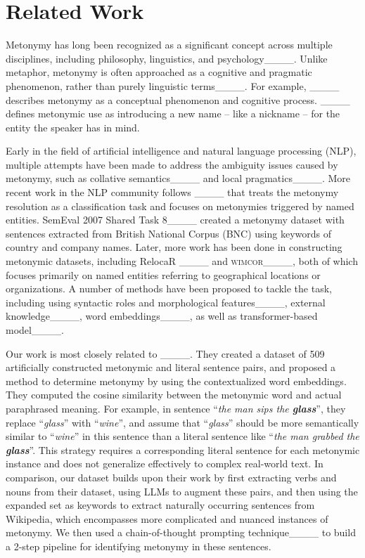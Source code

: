 \section{Related Work}
Metonymy has long been recognized as a significant concept across multiple disciplines,  including philosophy, linguistics, and psychology____. Unlike metaphor, metonymy is often approached as a cognitive and pragmatic phenomenon, rather than purely linguistic terms____. For example, ____ describes metonymy as a conceptual phenomenon and cognitive process.  ____ defines metonymic use as introducing a new name – like a nickname – for the entity the speaker has in mind. 

Early in the field of artificial intelligence and natural language processing (NLP), multiple attempts have been made to address the ambiguity issues caused by metonymy, such as collative semantics____ and local pragmatics____. More recent work in the NLP community follows ____ that treats the metonymy resolution as a classification task and focuses on metonymies triggered by named entities. SemEval 2007 Shared Task 8____ created a metonymy dataset with sentences extracted from British National Corpus (BNC) using keywords of country and company
names. Later, more work has been done in constructing metonymic datasets, including RelocaR ____ and \textsc{wimcor}____, both of which focuses primarily on named entities referring to geographical locations or organizations. A number of methods have been proposed to tackle the task, including using syntactic roles and morphological features____, external knowledge____, word embeddings____, as well as transformer-based model____.

Our work is most closely related to ____. They created a dataset of 509 artificially constructed metonymic and literal sentence pairs, and proposed a method to determine metonymy by using the contextualized word embeddings. They computed the cosine similarity between the metonymic word and actual paraphrased meaning. For example, in sentence ``\textit{the man sips the \textbf{glass}}'', they replace ``\textit{glass}'' with ``\textit{wine}'', and assume that ``\textit{glass}'' should be more semantically similar to ``\textit{wine}'' in this sentence than a literal sentence like ``\textit{the man grabbed the \textbf{glass}}''. This strategy requires a corresponding literal sentence for each metonymic instance and does not generalize effectively to complex real-world text. In comparison, our dataset builds upon their work by first extracting verbs and nouns from their dataset, using LLMs to augment these pairs, and then using the expanded set as keywords to extract naturally occurring sentences from Wikipedia, which encompasses more complicated and nuanced instances of metonymy. We then used a chain-of-thought prompting technique____ 
to build a 2-step pipeline for identifying metonymy in these sentences.